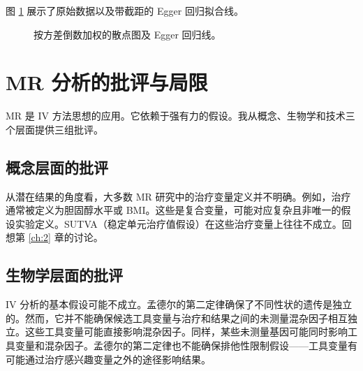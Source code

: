 图 \ref{fig:25-egger-scatter} 展示了原始数据以及带截距的 Egger 回归拟合线。

\begin{figure}[htbp]
\centering
\caption{按方差倒数加权的散点图及 Egger 回归线。}
\label{fig:25-egger-scatter}
\end{figure}

\section{MR 分析的批评与局限}\label{sec:25-critiques}

MR 是 IV 方法思想的应用。它依赖于强有力的假设。我从概念、生物学和技术三个层面提供三组批评。

\subsection{概念层面的批评}\label{sec:25-conceptual-critiques}

从潜在结果的角度看，大多数 MR 研究中的治疗变量定义并不明确。例如，治疗通常被定义为胆固醇水平或 BMI。这些是复合变量，可能对应复杂且非唯一的假设实验定义。SUTVA（稳定单元治疗值假设）在这些治疗变量上往往不成立。回想第 \ref{ch:2} 章的讨论。

\subsection{生物学层面的批评}\label{sec:25-biological-critiques}

IV 分析的基本假设可能不成立。孟德尔的第二定律确保了不同性状的遗传是独立的。然而，它并不能确保候选工具变量与治疗和结果之间的未测量混杂因子相互独立。这些工具变量可能直接影响混杂因子。同样，某些未测量基因可能同时影响工具变量和混杂因子。孟德尔的第二定律也不能确保排他性限制假设——工具变量有可能通过治疗感兴趣变量之外的途径影响结果。

